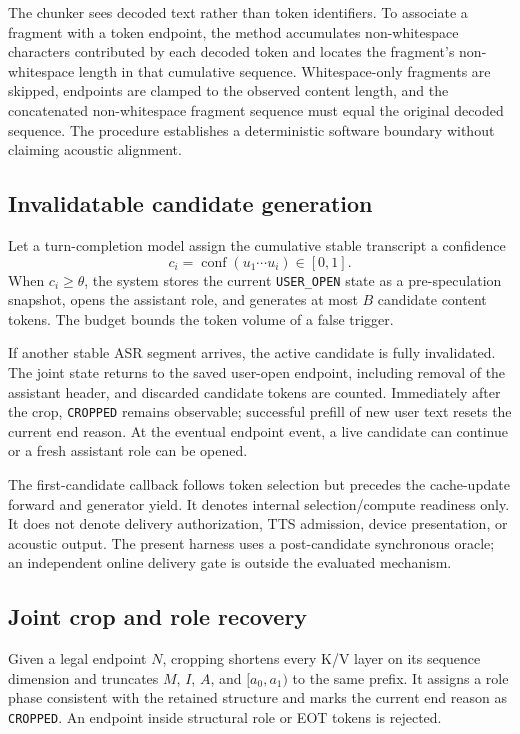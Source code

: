 The chunker sees decoded text rather than token identifiers. To associate a fragment with a token endpoint, the method accumulates non-whitespace characters contributed by each decoded token and locates the fragment's non-whitespace length in that cumulative sequence. Whitespace-only fragments are skipped, endpoints are clamped to the observed content length, and the concatenated non-whitespace fragment sequence must equal the original decoded sequence. The procedure establishes a deterministic software boundary without claiming acoustic alignment.

\subsection{Invalidatable candidate generation}

Let a turn-completion model assign the cumulative stable transcript a confidence
\begin{equation}
c_i=\operatorname{conf}(u_1\cdots u_i)\in[0,1].
\label{eq:trigger}
\end{equation}
When $c_i\geq\theta$, the system stores the current \texttt{USER\_OPEN} state as a pre-speculation snapshot, opens the assistant role, and generates at most $B$ candidate content tokens. The budget bounds the token volume of a false trigger.

If another stable ASR segment arrives, the active candidate is fully invalidated. The joint state returns to the saved user-open endpoint, including removal of the assistant header, and discarded candidate tokens are counted. Immediately after the crop, \texttt{CROPPED} remains observable; successful prefill of new user text resets the current end reason. At the eventual endpoint event, a live candidate can continue or a fresh assistant role can be opened.

The first-candidate callback follows token selection but precedes the cache-update forward and generator yield. It denotes internal selection/compute readiness only. It does not denote delivery authorization, TTS admission, device presentation, or acoustic output. The present harness uses a post-candidate synchronous oracle; an independent online delivery gate is outside the evaluated mechanism.

\subsection{Joint crop and role recovery}

Given a legal endpoint $N$, cropping shortens every K/V layer on its sequence dimension and truncates $M$, $I$, $A$, and $[a_0,a_1)$ to the same prefix. It assigns a role phase consistent with the retained structure and marks the current end reason as \texttt{CROPPED}. An endpoint inside structural role or EOT tokens is rejected.

